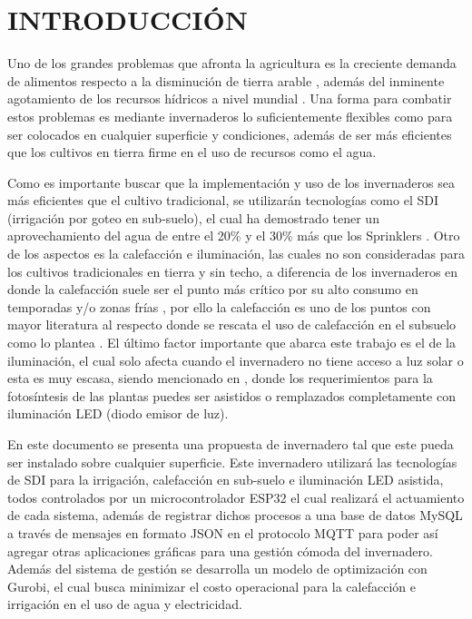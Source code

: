 \documentclass[letterpaper,conference]{IEEEtran}
\begin{document}
\IEEEpeerreviewmaketitle

\section{INTRODUCCIÓN}

Uno de los grandes problemas que afronta la agricultura es la creciente demanda de alimentos respecto a la disminución de tierra arable \textcite{Specht2014}, además del inminente agotamiento de los recursos hídricos a nivel mundial  \parencite{Baldos2016}. Una forma para combatir estos problemas es mediante invernaderos lo suficientemente flexibles como para ser colocados en cualquier superficie y condiciones, además de ser más eficientes que los cultivos en tierra firme en el uso de recursos como el agua.

Como es importante buscar que la implementación y uso de los invernaderos sea más eficientes que el cultivo tradicional, se utilizarán tecnologías como el SDI (irrigación por goteo en sub-suelo), el cual ha demostrado tener un aprovechamiento del agua de entre el 20\% y el 30\% más que los Sprinklers \parencite{Zaccaria2017}. Otro de los aspectos es la calefacción e iluminación, las cuales no son consideradas para los cultivos tradicionales en tierra y sin techo, a diferencia de los invernaderos en donde la calefacción suele ser el punto más crítico por su alto consumo en temporadas y/o zonas frías \textcite{Dong2018}, por ello la calefacción es uno de los puntos con mayor literatura al respecto donde se rescata el uso de calefacción en el subsuelo como lo plantea \parencite{Kurpaska2000}. El último factor importante que abarca este trabajo es el de la iluminación, el cual solo afecta cuando el invernadero no tiene acceso a luz solar o esta es muy escasa, siendo mencionado en \parencite{VanIersel2017}, donde los requerimientos para la fotosíntesis de las plantas puedes ser asistidos o remplazados completamente con iluminación LED (diodo emisor de luz).

En este documento se presenta una propuesta de invernadero tal que este pueda ser instalado sobre cualquier superficie. Este invernadero utilizará las tecnologías de SDI para la irrigación, calefacción en sub-suelo e iluminación LED asistida, todos controlados por un microcontrolador ESP32 el cual realizará el actuamiento de cada sistema, además de registrar dichos procesos a una base de datos MySQL a través de mensajes en formato JSON en el protocolo MQTT para poder así agregar otras aplicaciones gráficas para una gestión cómoda del invernadero. Además del sistema de gestión se desarrolla un modelo de optimización con Gurobi, el cual busca minimizar el costo operacional para la calefacción e irrigación en el uso de agua y electricidad.
\end{document}
